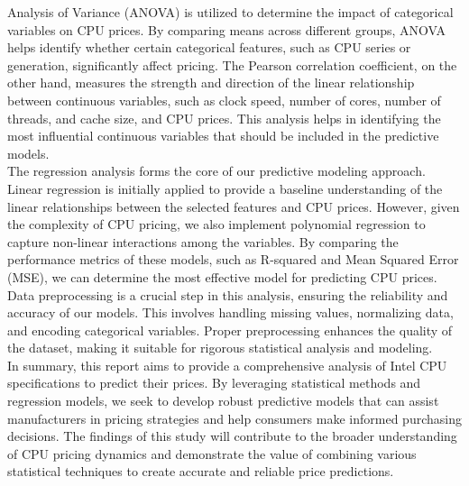 Analysis of Variance (ANOVA) is utilized to determine the impact of categorical variables on CPU prices. By comparing means across different groups, ANOVA helps identify whether certain categorical features, such as CPU series or generation, significantly affect pricing. The Pearson correlation coefficient, on the other hand, measures the strength and direction of the linear relationship between continuous variables, such as clock speed, number of cores, number of threads, and cache size, and CPU prices. This analysis helps in identifying the most influential continuous variables that should be included in the predictive models.\\

The regression analysis forms the core of our predictive modeling approach. Linear regression is initially applied to provide a baseline understanding of the linear relationships between the selected features and CPU prices. However, given the complexity of CPU pricing, we also implement polynomial regression to capture non-linear interactions among the variables. By comparing the performance metrics of these models, such as R-squared and Mean Squared Error (MSE), we can determine the most effective model for predicting CPU prices.\\

Data preprocessing is a crucial step in this analysis, ensuring the reliability and accuracy of our models. This involves handling missing values, normalizing data, and encoding categorical variables. Proper preprocessing enhances the quality of the dataset, making it suitable for rigorous statistical analysis and modeling.\\

In summary, this report aims to provide a comprehensive analysis of Intel CPU specifications to predict their prices. By leveraging statistical methods and regression models, we seek to develop robust predictive models that can assist manufacturers in pricing strategies and help consumers make informed purchasing decisions. The findings of this study will contribute to the broader understanding of CPU pricing dynamics and demonstrate the value of combining various statistical techniques to create accurate and reliable price predictions.\\

\newpage
